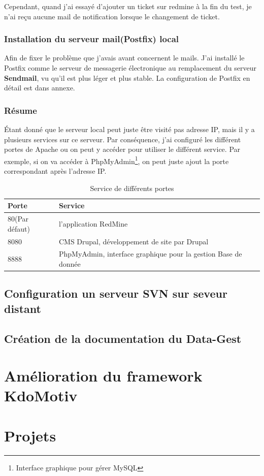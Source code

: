 Cependant, quand j'ai essayé d'ajouter un ticket sur redmine à la fin du test, je n'ai reçu aucune  mail de notification lorsque le changement de ticket.

\subsubsection{Installation du serveur mail(Postfix) local}
Afin de fixer le problème que j'avais avant concernent le mails. J'ai installé le Postfix comme le serveur de messagerie électronique au remplacement du serveur \textbf{Sendmail}, vu qu'il est plus léger et plus stable. La configuration de Postfix en détail est dans annexe.

\subsubsection{Résume}
Étant donné que le serveur local peut juste être visité pas adresse IP, mais il y a plusieurs services sur ce serveur. Par conséquence, j'ai configuré les différent portes de Apache ou on peut y accéder pour utiliser le différent service. Par exemple, si on va accéder à PhpMyAdmin\footnote{Interface graphique pour gérer MySQL}, on peut juste ajout la porte correspondant après l'adresse IP.

\begin{table}[htbp]
\centering
\begin{tabular}{ll}
  \toprule
  Porte & Service\\
  \midrule
	80(Par défaut) & l'application RedMine \\ 
	 
	8080 & CMS Drupal, développement de site par Drupal \\ 
	 
	8888 & PhpMyAdmin, interface graphique pour la gestion Base de donnée \\ 
	 
  \bottomrule
\end{tabular}
 \caption{\label{tab:Service de différents portes}Service de différents portes}
\end{table}




\subsection{Configuration un serveur SVN sur seveur distant}

\subsection{Création de la documentation du Data-Gest}


\section{Amélioration du framework KdoMotiv}

\section{Projets}

